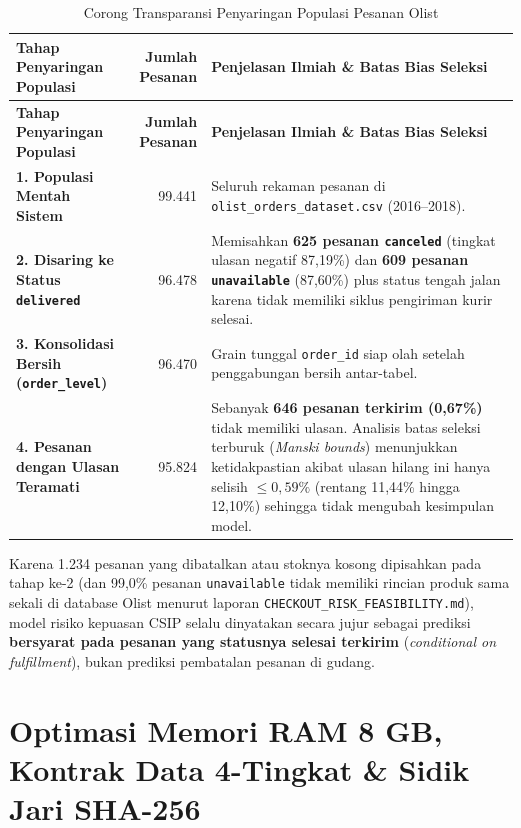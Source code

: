 \documentclass[11pt,a4paper,oneside]{book}
\newcommand{\code}[1]{{\small\nolinkurl{#1}}}
\begin{document}
\begin{longtable}{@{} >{\raggedright\arraybackslash}p{4.7cm} r >{\raggedright\arraybackslash}p{8.2cm} @{}}
\caption{Corong Transparansi Penyaringan Populasi Pesanan Olist} \\
\toprule
\textbf{Tahap Penyaringan Populasi} & \textbf{Jumlah Pesanan} & \textbf{Penjelasan Ilmiah \& Batas Bias Seleksi} \\
\midrule
\endfirsthead
\toprule
\textbf{Tahap Penyaringan Populasi} & \textbf{Jumlah Pesanan} & \textbf{Penjelasan Ilmiah \& Batas Bias Seleksi} \\
\midrule
\endhead
\bottomrule
\endfoot
\textbf{1. Populasi Mentah Sistem} & 99.441 & Seluruh rekaman pesanan di \code{olist_orders_dataset.csv} (2016--2018). \\
\textbf{2. Disaring ke Status \code{delivered}} & 96.478 & Memisahkan \textbf{625 pesanan \code{canceled}} (tingkat ulasan negatif 87,19\%) dan \textbf{609 pesanan \code{unavailable}} (87,60\%) plus status tengah jalan karena tidak memiliki siklus pengiriman kurir selesai. \\
\textbf{3. Konsolidasi Bersih (\code{order_level})} & 96.470 & Grain tunggal \code{order_id} siap olah setelah penggabungan bersih antar-tabel. \\
\textbf{4. Pesanan dengan Ulasan Teramati} & 95.824 & Sebanyak \textbf{646 pesanan terkirim (0,67\%)} tidak memiliki ulasan. Analisis batas seleksi terburuk (\emph{Manski bounds}) menunjukkan ketidakpastian akibat ulasan hilang ini hanya selisih $\le 0,59\%$ (rentang 11,44\% hingga 12,10\%) sehingga tidak mengubah kesimpulan model. \\
\end{longtable}

\begin{kejujuranbox}
Karena 1.234 pesanan yang dibatalkan atau stoknya kosong dipisahkan pada tahap ke-2 (dan 99,0\% pesanan \code{unavailable} tidak memiliki rincian produk sama sekali di database Olist menurut laporan \code{CHECKOUT_RISK_FEASIBILITY.md}), model risiko kepuasan CSIP selalu dinyatakan secara jujur sebagai prediksi \textbf{bersyarat pada pesanan yang statusnya selesai terkirim} (\emph{conditional on fulfillment}), bukan prediksi pembatalan pesanan di gudang.
\end{kejujuranbox}

\section{Optimasi Memori RAM 8 GB, Kontrak Data 4-Tingkat \& Sidik Jari SHA-256}
\end{document}
